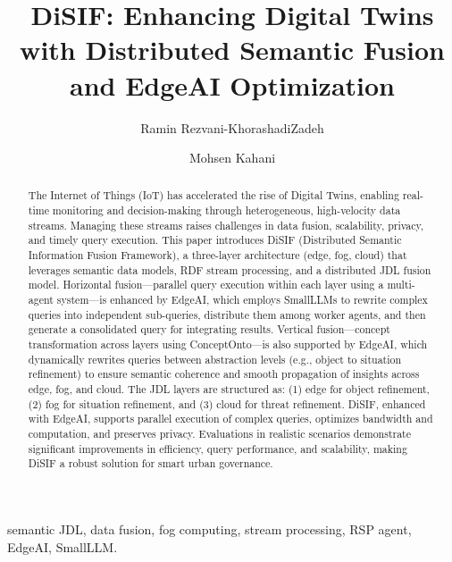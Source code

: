 \documentclass[5p,times]{elsarticle}
\begin{document}
\begin{frontmatter}
\title{DiSIF: Enhancing Digital Twins with Distributed Semantic Fusion and EdgeAI Optimization}
\author{Ramin Rezvani-KhorashadiZadeh}
\author{Mohsen Kahani}
\address{Department of Computer Engineering, Ferdowsi University of Mashhad, Mashhad, Iran }
\begin{abstract}
  The Internet of Things (IoT) has accelerated the rise of Digital Twins,
   enabling real-time monitoring and decision-making through heterogeneous,
    high-velocity data streams. Managing these streams raises challenges in 
    data fusion, scalability, privacy, and timely query execution. This paper 
    introduces DiSIF (Distributed Semantic Information Fusion Framework), 
    a three-layer architecture (edge, fog, cloud) that leverages semantic data models,
     RDF stream processing, and a distributed JDL fusion model.
     Horizontal fusion—parallel query execution within each layer using a multi-agent system—is
      enhanced by EdgeAI, which employs SmallLLMs to rewrite complex queries into
       independent sub-queries, distribute them among worker agents, and then generate 
       a consolidated query for integrating results. 
       Vertical fusion—concept transformation across layers using ConceptOnto—is
        also supported by EdgeAI, which dynamically rewrites queries between abstraction levels
         (e.g., object to situation refinement) to ensure semantic coherence and smooth
          propagation of insights across edge, fog, and cloud.
           The JDL layers are structured as: (1) edge for object refinement, 
           (2) fog for situation refinement, and (3) cloud for threat refinement.
            DiSIF, enhanced with EdgeAI, supports parallel execution of
             complex queries, optimizes bandwidth and computation,
              and preserves privacy. Evaluations in realistic scenarios demonstrate 
              significant improvements in efficiency, query performance,
               and scalability, making DiSIF a robust solution for smart urban governance.

  
\end{abstract}
\begin{keyword}
semantic JDL, data fusion, fog computing, stream processing, RSP agent, EdgeAI, SmallLLM.
\end{keyword}
\end{frontmatter}
\end{document}
